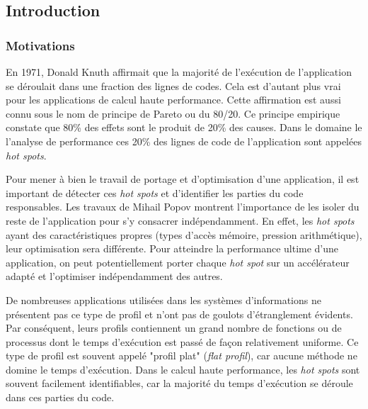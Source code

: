 \subsection{Introduction}


    \subsubsection{Motivations}

        En 1971, Donald Knuth affirmait que la majorité de l’exécution de l’application se déroulait dans une fraction des lignes de codes\cite{knuth1971empirical}. Cela est d’autant plus vrai pour les applications de calcul haute performance. Cette affirmation est aussi connu sous le nom de principe de Pareto ou du 80/20. Ce principe empirique constate que 80\% des effets sont le produit de 20\% des causes. Dans le domaine le l’analyse de performance ces 20\% des lignes de code de l'application sont appelées \textit{hot spots}.
        
        Pour mener à bien le travail de portage et d'optimisation d’une application, il est important de détecter ces \textit{hot spots} et d'identifier les parties du code responsables. Les travaux de Mihail Popov \cite{popov:tel-01412638}  montrent l’importance de les isoler du reste de l’application pour s’y consacrer indépendamment. En effet, les \textit{hot spots} ayant des caractéristiques propres (types d'accès mémoire, pression arithmétique), leur optimisation sera différente. Pour atteindre la performance ultime d’une application, on peut potentiellement porter chaque \textit{hot spot} sur un accélérateur adapté et l’optimiser indépendamment des autres.
        
        De nombreuses applications utilisées dans les systèmes d'informations ne présentent pas ce type de profil et  n'ont pas de goulots d'étranglement évidents. Par conséquent, leurs profils contiennent un grand nombre de fonctions ou de processus dont le temps d'exécution est passé de façon relativement uniforme\cite{Amaral2015}. Ce type de profil est souvent appelé "profil plat" (\textit{flat profil}), car aucune méthode ne domine le temps d'exécution. Dans le calcul haute performance, les \textit{hot spots} sont souvent facilement identifiables, car la majorité du temps d'exécution se déroule dans ces parties du code. 
        
